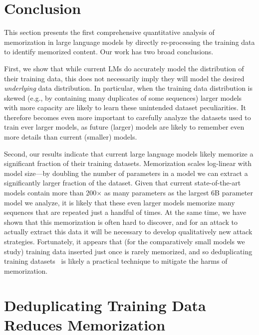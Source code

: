 \section{Conclusion}

%
This section presents the first comprehensive quantitative analysis of memorization in
large language models by directly re-processing the training data to identify memorized content.
%
Our work has two broad conclusions.

First, we show that while current LMs do accurately model the distribution of their training data, this does not necessarily imply they will model the desired \emph{underlying} data distribution.
In particular, when the training data distribution is skewed (e.g., by containing many duplicates of some sequences) larger models with more capacity are likely to learn these unintended dataset peculiarities.
%
It therefore becomes even more important to carefully analyze the datasets used to train ever larger models, as future (larger) models are likely to remember even more details than current (smaller) models.


Second, our results indicate that current large language models likely memorize a significant fraction of their training datasets.
%
Memorization scales log-linear with model size---by doubling the number of parameters in a model we can extract a significantly larger fraction of the dataset.
%
Given that current state-of-the-art models contain more than 200$\times$ as many parameters as the largest 6B parameter model we analyze, it is likely that these even larger models memorize many sequences that are repeated just a handful of times.
%
At the same time, we have shown that this memorization is often hard to discover, and for an attack to actually extract this data it will be necessary to develop qualitatively new attack strategies.
%
Fortunately, it appears that (for the comparatively small models we study) training data inserted just once is rarely memorized, and so deduplicating training datasets~\citep{lee2021deduplicating} is likely a practical technique to mitigate the harms of memorization.


\section{Deduplicating Training Data Reduces Memorization}

